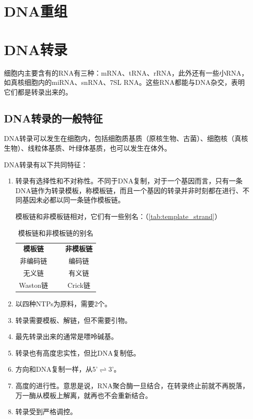 \section{DNA重组}

\section{DNA转录}

细胞内主要含有的RNA有三种：mRNA、tRNA、rRNA，此外还有一些小RNA，如真核细胞内的miRNA、snRNA、7SL RNA。这些RNA都能与DNA杂交，表明它们都是转录出来的。

\subsection{DNA转录的一般特征}

DNA转录可以发生在细胞内，包括细胞质基质（原核生物、古菌）、细胞核（真核生物）、线粒体基质、叶绿体基质，也可以发生在体外。

DNA转录有以下共同特征：

\begin{enumerate}
	\item 转录有选择性和不对称性。不同于DNA复制，对于一个基因而言，只有一条DNA链作为转录模板，称模板链，而且一个基因的转录并非时刻都在进行、不同基因未必都以同一条链作模板链。

	模板链和非模板链相对，它们有一些别名：（\autoref{tab:template_strand}）

	\begin{table}[h!]
		\centering
		\begin{tabular}{|c|l|c|}
			\cline{1-1} \cline{3-3}
			\textbf{模板链} & ~ & \textbf{非模板链} \\ \cline{1-1} \cline{3-3}
			非编码链 &  & 编码链 \\ \cline{1-1} \cline{3-3}
			无义链 &  & 有义链 \\ \cline{1-1} \cline{3-3}
			Waston链 &  & Crick链 \\ \cline{1-1} \cline{3-3}
		\end{tabular}
		\caption{模板链和非模板链的别名}
		\label{tab:template_strand}
	\end{table}

	\item 以四种NTPs为原料，需要2个。
	\item 转录需要模板、解链，但不需要引物。
	\item 最先转录出来的通常是嘌呤碱基。
	\item 转录也有高度忠实性，但比DNA复制低。
	\item 方向和DNA复制一样，从5'$\rightleftharpoons$3'。
	\item 高度的进行性。意思是说，RNA聚合酶一旦结合，在转录终止前就不再脱落，万一酶从模板上解离，就再也不会重新结合。
	\item 转录受到严格调控。
\end{enumerate}

